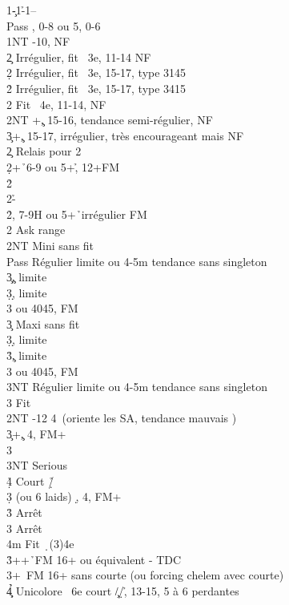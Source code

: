 \documentclass[a4paper]{article}
\begin{document}
\begin{bidtable}
1\c-1\h-1\s--\+\\
Pass \s , 0-8 ou 5\s , 0-6\\
1NT -10, NF\+\\
2\c \> Irrégulier, fit \s\ 3e, 11-14 NF\\
2\d \> Irrégulier, fit \s\ 3e, 15-17, type 3145\\
2\h \> Irrégulier, fit \s\ 3e, 15-17, type 3415\\
2\s \> Fit \s\ 4e, 11-14, NF\\
2NT +\c , 15-16, tendance semi-régulier, NF\\
3\c {}+\c , 15-17, irrégulier, très encourageant mais NF\-\\
2\c \> Relais pour 2\d \\
2\d {}+\h\ 6-9 ou 5+\h , 12+FM\+\\
2\h {}\h \\
2\s {}-\h \-\\
2\h {}\s , 7-9H ou 5+\h\ irrégulier FM\\
2\s \> Ask range\+\\
2NT \> Mini sans fit \s \+\\
Pass \> Régulier limite ou 4\s -5m tendance sans singleton\\
3\c {}\c , limite\\
3\d {}\d , limite\\
3\s {} ou 4045, FM\-\\
3\c \> Maxi sans fit \s \+\\
3\d {}\d , limite\\
3\h {}\c , limite\\
3\s {} ou 4045, FM\\
3NT \> Régulier limite ou 4\s -5m tendance sans singleton\-\\
3\s \> Fit \s \-\\
2NT -12 4\s\ (oriente les SA, tendance mauvais \s )\\
3\c {}+\c , 4\s , FM+\+\\
3\s {}\s \+\\
3NT \> Serious\\
4\d\h \> Court \d /\h \-\-\\
3\d {} (ou 6 laids) \d , 4\s , FM+\+\\
3\h \> Arrêt \h \\
3\s \> Arrêt \c \\
4m \> Fit \d\ (3)4e\-\\
3\h {}++\h\ FM 16+ ou équivalent - TDC\\
3\s {}+\s\ FM 16+ sans courte (ou forcing chelem avec courte)\\
4\c\d\h \> Unicolore \s\ 6e court \c /\d /\h , 13-15, 5 à 6 perdantes\-
\end{bidtable}
\end{document}
